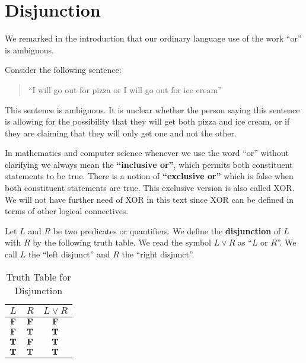 \section{Disjunction}

We remarked in the introduction that our ordinary language use of the work ``or'' is ambiguous.  

Consider the following sentence:

\begin{quote}
	``I will go out for pizza or I will go out for ice cream''
\end{quote}

This sentence is ambiguous.  It is unclear whether the person saying this sentence is allowing for the possibility that they will get both pizza and ice cream, or if they are claiming that they will only get one and not the other.

In mathematics and computer science whenever we use the word ``or'' without clarifying we always mean the \textbf{``inclusive or''}, which permits both constituent statements to be true.  There is a notion of \textbf{``exclusive or''} which is false when both constituent statements are true.  This exclusive version is also called XOR.  We will not have further need of XOR in this text since XOR can be defined in terms of other logical connectives.

\begin{definition}
		Let $L$ and $R$ be two predicates or quantifiers.  We define the \textbf{disjunction} of $L$ with $R$ by the following truth table.  We read the symbol $L \vee R$ as ``$L$ or $R$''.  We call $L$ the ``left disjunct'' and $R$ the ``right disjunct''.
		
				\begin{table}[h!]
			\begin{center}
				\caption{Truth Table for Disjunction}
				\begin{tabular}{c|c|c} 
					$L$ & $R$ & $L \vee R$ \\
					\hline
					$\textbf{\textrm{F}}$ & $\textbf{\textrm{F}}$ & $\textbf{\textrm{F}}$ \\ 
					$\textbf{\textrm{F}}$ & $\textbf{\textrm{T}}$ & $\textbf{\textrm{T}}$ \\ 
					$\textbf{\textrm{T}}$ & $\textbf{\textrm{F}}$ & $\textbf{\textrm{T}}$ \\ 
					$\textbf{\textrm{T}}$ & $\textbf{\textrm{T}}$ & $\textbf{\textrm{T}}$ \\ 
				\end{tabular}
			\end{center}
		\end{table}
	\end{definition}

